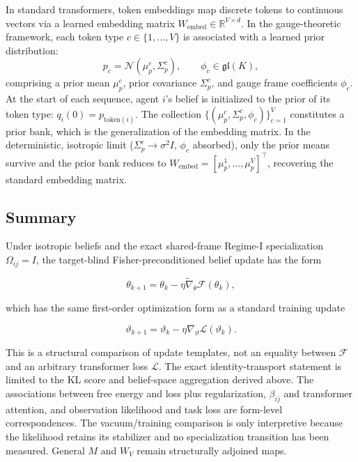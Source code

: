 \documentclass[twoside,11pt]{article}
\begin{document}
In standard transformers, token embeddings map discrete tokens to continuous vectors via a learned embedding matrix $W_{\text{embed}} \in \mathbb{R}^{V \times d}$. In the gauge-theoretic framework, each token type $c \in \{1, \ldots, V\}$ is associated with a learned prior distribution:
\begin{equation}
p_c = \mathcal{N}(\mu_p^c, \Sigma_p^c), \qquad \phi_c \in \mathfrak{gl}(K),
\label{eq:prior_bank}
\end{equation}
comprising a prior mean $\mu_p^c$, prior covariance $\Sigma_p^c$, and gauge frame coefficients $\phi_c$. At the start of each sequence, agent $i$'s belief is initialized to the prior of its token type: $q_i(0) = p_{\mathrm{token}(i)}$. The collection $\{(\mu_p^c, \Sigma_p^c, \phi_c)\}_{c=1}^V$ constitutes a prior bank, which is the generalization of the embedding matrix. In the deterministic, isotropic limit ($\Sigma_p^c \to \sigma^2 I$, $\phi_c$ absorbed), only the prior means survive and the prior bank reduces to $W_{\text{embed}} = [\mu_p^1, \ldots, \mu_p^V]^\top$, recovering the standard embedding matrix.


\subsection{Summary}

Under isotropic beliefs and the exact shared-frame Regime-I specialization $\Omega_{ij} = I$, the target-blind Fisher-preconditioned belief update has the form

\begin{equation}
\theta_{k+1} = \theta_k - \eta \tilde{\nabla}_\theta \mathcal{F}(\theta_k),
\end{equation}

which has the same first-order optimization form as a standard training update

\begin{equation}
\vartheta_{k+1} = \vartheta_k - \eta \nabla_\vartheta \mathcal{L}(\vartheta_k).
\end{equation}

This is a structural comparison of update templates, not an equality between $\mathcal{F}$ and an arbitrary transformer loss $\mathcal{L}$. The exact identity-transport statement is limited to the KL score and belief-space aggregation derived above. The associations between free energy and loss plus regularization, $\beta_{ij}$ and transformer attention, and observation likelihood and task loss are form-level correspondences. The vacuum/training comparison is only interpretive because the likelihood retains its stabilizer and no specialization transition has been measured. General $M$ and $W_V$ remain structurally adjoined maps.
\end{document}
